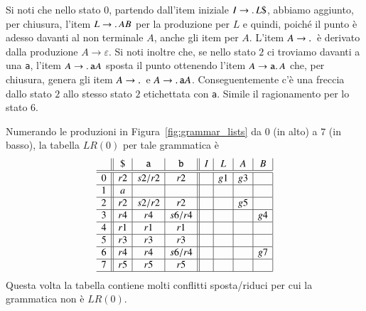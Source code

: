 %
Si noti che nello stato $0$, partendo dall'item iniziale
$I\to.\, L\mathtt{\$}$, abbiamo aggiunto, per chiusura, l'item
$L\to.\, AB$ per la produzione per $L$ e quindi, poich\'e il punto
\`e adesso davanti al non terminale $A$, anche gli item per $A$.
L'item $A\to.\,$ \`e derivato dalla produzione $A\to\varepsilon$.
Si noti inoltre che, se nello stato $2$ ci troviamo davanti a una \texttt{a},
l'item $A\to.\,\mathtt{a}A$ sposta il punto ottenendo l'item
$A\to\mathtt{a}.\, A$ che, per chiusura, genera gli item
$A\to.\,$ e $A\to.\,\mathtt{a}A$. Conseguentemente c'\`e una freccia
dallo stato $2$ allo stesso stato $2$ etichettata con \texttt{a}.
Simile il ragionamento per lo stato $6$.

Numerando le produzioni in Figura~\ref{fig:grammar_lists} da $0$
(in alto) a $7$ (in basso), la tabella $\mathit{LR}(0)$ per tale grammatica \`e
%
\begin{equation}\label{eq:lr0_lists_table}
\begin{array}{c||c|c|c||c|c|c|c|}
  & \mathtt{\$} & \mathtt{a} & \mathtt{b} & I  & L  & A  & B  \\\hline\hline
0 & r2          & s2/r2      & r2         &    & g1 & g3 &    \\\hline
1 & a           &            &            &    &    &    &    \\\hline
2 & r2          & s2/r2      & r2         &    &    & g5 &    \\\hline
3 & r4          & r4         & s6/r4      &    &    &    & g4 \\\hline
4 & r1          & r1         & r1         &    &    &    &    \\\hline
5 & r3          & r3         & r3         &    &    &    &    \\\hline
6 & r4          & r4         & s6/r4      &    &    &    & g7 \\\hline
7 & r5          & r5         & r5         &    &    &    &    \\\hline
\end{array}
\end{equation}
%
Questa volta la tabella contiene molti conflitti sposta/riduci per cui
la grammatica non \`e $\mathit{LR}(0)$.
%
